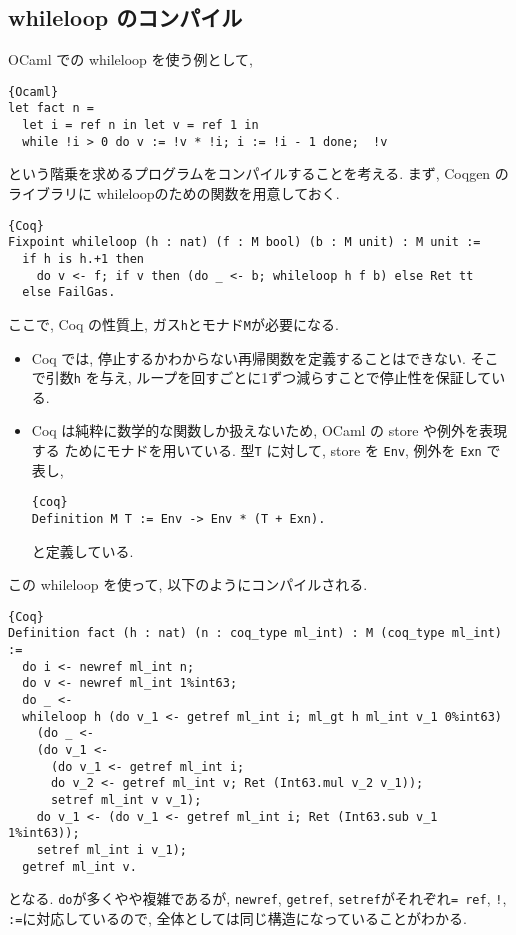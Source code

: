 \documentclass[11pt]{jarticle}
\theoremstyle{mystyle}
\newcommand{\0}{\textbf{0}}
\newcommand{\1}{\textbf{1}}
\newcommand{\2}{\textbf{2}}
\begin{document}
\subsection{whileloop のコンパイル}
OCaml での whileloop を使う例として, 
\begin{lstlisting}{Ocaml}
let fact n =
  let i = ref n in let v = ref 1 in
  while !i > 0 do v := !v * !i; i := !i - 1 done;  !v
\end{lstlisting}
という階乗を求めるプログラムをコンパイルすることを考える. 
まず, Coqgen のライブラリに whileloopのための関数を用意しておく. 
\begin{lstlisting}{Coq}
Fixpoint whileloop (h : nat) (f : M bool) (b : M unit) : M unit :=
  if h is h.+1 then
    do v <- f; if v then (do _ <- b; whileloop h f b) else Ret tt
  else FailGas.  \end{lstlisting}
ここで, Coq の性質上, ガス{\tt h}とモナド{\tt M}が必要になる. 
\begin{itemize}
  \item Coq では, 停止するかわからない再帰関数を定義することはできない. そこで引数{\tt h}
          を与え, ループを回すごとに1ずつ減らすことで停止性を保証している.   
  \item Coq は純粋に数学的な関数しか扱えないため, OCaml の store や例外を表現する
          ためにモナドを用いている. 型{\tt T} に対して, store を {\tt Env}, 例外を {\tt Exn}
          で表し, 
  		    \begin{lstlisting}{coq}
Definition M T := Env -> Env * (T + Exn). \end{lstlisting}
  		    と定義している.
\end{itemize}
この whileloop を使って, 以下のようにコンパイルされる. 
\begin{lstlisting}{Coq}
Definition fact (h : nat) (n : coq_type ml_int) : M (coq_type ml_int) :=
  do i <- newref ml_int n;
  do v <- newref ml_int 1%int63;
  do _ <-
  whileloop h (do v_1 <- getref ml_int i; ml_gt h ml_int v_1 0%int63)
    (do _ <-
    (do v_1 <-
      (do v_1 <- getref ml_int i;
      do v_2 <- getref ml_int v; Ret (Int63.mul v_2 v_1));
      setref ml_int v v_1);
    do v_1 <- (do v_1 <- getref ml_int i; Ret (Int63.sub v_1 1%int63));
    setref ml_int i v_1);
  getref ml_int v.  \end{lstlisting}
となる. {\tt do}が多くやや複雑であるが, {\tt newref}, {\tt getref}, {\tt setref}がそれぞれ{\tt = ref}, {\tt !}, {\tt :=}に対応しているので, 全体としては同じ構造になっていることがわかる. 
\end{document}
